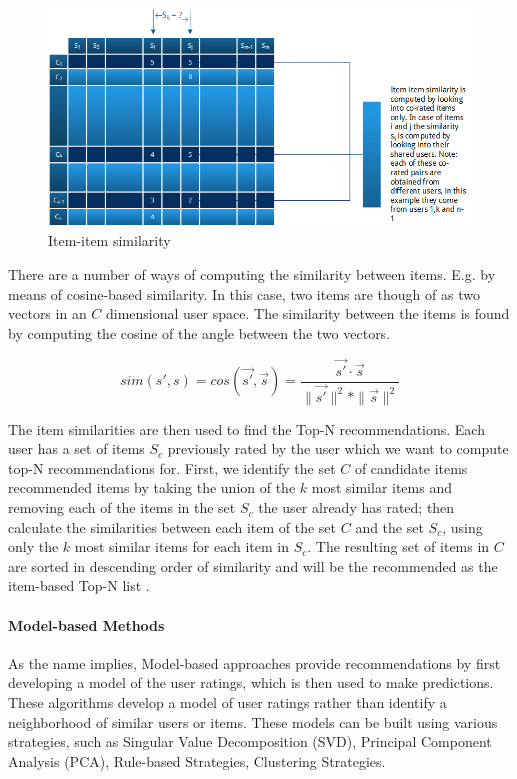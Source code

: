 \begin{figure}[H]
    \includegraphics[width=5in]{image/itemsim.png}
    \centering
    \caption[Item-item similarity]{Item-item similarity}
    \label{figure:itemsim}
\end{figure}

There are a number of ways of computing the similarity between items. E.g. by
means of cosine-based similarity. In this case, two items are though of as two
vectors in an $C$ dimensional user space. The similarity between the items is
found by computing the cosine of the angle between the two vectors.

\begin{equation}
sim(s',s) = cos(\vec{s'},\vec{s}) = \frac{\vec{s'} \cdot \vec{s}}{\|\vec{s'}\|^{2} * \|\vec{s}\|^{2}}
\end{equation}

The item similarities are then used to find the Top-N recommendations. Each
user has a set of items $S_{c}$ previously rated by the user which we want to
compute top-N recommendations for. First, we identify the set $C$ of candidate
items recommended items by taking the union of the $k$ most similar items and
removing each of the items in the set $S_{c}$ the user already has rated; then
calculate the similarities between each item of the set $C$ and the set
$S_{c}$, using only the $k$ most similar items for each item in $S_{c}$. The
resulting set of items in $C$ are sorted in descending order of similarity and
will be the recommended as the item-based Top-N list
\cite{Karypis2001}.\newline

\paragraph{Model-based Methods}

As the name implies, Model-based approaches provide recommendations by first
developing a model of the user ratings, which is then used to make predictions.
These algorithms develop a model of user ratings rather than identify a
neighborhood of similar users or items. These models can be built using various
strategies, such as Singular Value Decomposition (SVD), Principal Component
Analysis (PCA), Rule-based Strategies, Clustering Strategies.

